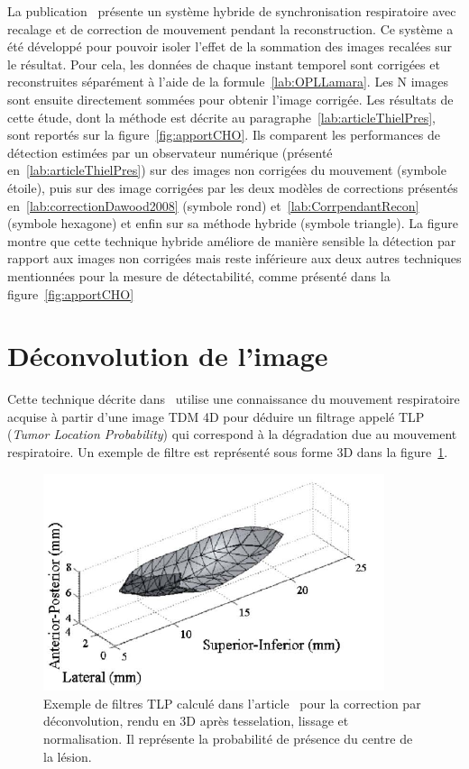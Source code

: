  La publication~\cite{Thielemans2006Lesion} présente un système hybride de synchronisation respiratoire avec recalage et de correction de mouvement pendant la reconstruction. Ce système a été développé pour pouvoir isoler l'effet de la sommation des images recalées sur le résultat. Pour cela, les données de chaque instant temporel sont corrigées et reconstruites séparément à l'aide de la formule~\ref{lab:OPLLamara}. Les N images sont ensuite directement sommées pour obtenir l'image corrigée. Les résultats de cette étude, dont la méthode est décrite au paragraphe~\ref{lab:articleThielPres}, sont reportés sur la figure~\ref{fig:apportCHO}. Ils comparent les performances de détection estimées par un observateur numérique (présenté en~\ref{lab:articleThielPres}) sur des images non corrigées du mouvement (symbole étoile), puis sur des image corrigées par les deux modèles de corrections présentés en~\ref{lab:correctionDawood2008} (symbole rond) et~\ref{lab:CorrpendantRecon} (symbole hexagone) et enfin sur sa méthode hybride (symbole triangle). La figure montre que cette technique hybride améliore de manière sensible la détection par rapport aux images non corrigées mais reste inférieure aux deux autres techniques mentionnées pour la mesure de détectabilité, comme présenté dans la figure~\ref{fig:apportCHO}
\label{lab:evolGating}

\section{Déconvolution de l'image}

Cette technique décrite dans~\cite{naqa2006deblurring} utilise une connaissance du mouvement respiratoire acquise à partir d'une image TDM 4D pour déduire un filtrage appelé TLP (\textit{Tumor Location Probability}) qui correspond à la dégradation due au mouvement respiratoire. Un exemple de filtre est représenté sous forme 3D dans la figure~\ref{fig:formeTLP}.

\begin{figure}[h!]
	\begin{center}
		\includegraphics[width=10cm]{images/formeTLP}
	\end{center}
	\caption[Exemple de filtres TLP pour la correction par déconvolution]{Exemple de filtres TLP calculé dans l'article~\cite{naqa2006deblurring} pour la correction par déconvolution, rendu en 3D après tesselation, lissage et normalisation. Il représente la probabilité de présence du centre de la lésion.} 
	\label{fig:formeTLP}
\end{figure}



